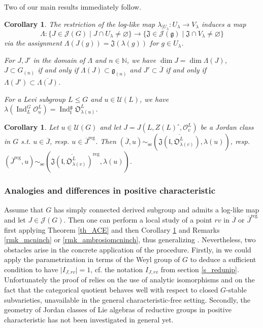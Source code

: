 \documentclass[12pt]{amsart}
\newtheorem{Corollary}[Theorem]{Corollary}
\theoremstyle{definition}
\theoremstyle{remark}
\newcommand{\g}{\mathfrak{g}}
\renewcommand{\l}{\mathfrak{l}}
\newcommand{\J}{\mathfrak{J}}
\newcommand{\orb}{\mathfrak{O}}
\renewcommand{\O}{\mathcal{O}}
\newcommand{\U}{\mathcal{U}}
\newcommand{\reg}{{\operatorname{reg}}}
\newcommand{\Ind}{\operatorname{Ind}}
\newcommand{\se}{\operatorname{se}}
\begin{document}
Two of our main results immediately follow.
\begin{Corollary} \label{cor_respect}
The restriction of the log-like map $\lambda_{\mid U_\lambda} \colon U_\lambda \to V_\lambda$ induces a map
 $$ \Lambda \colon \{  J \in \mathcal{J}(G) \mid J \cap U_\lambda \neq \varnothing \} \to \{ \J \in \mathcal{J}(\g) \mid \J \cap V_\lambda \neq \varnothing \}$$
 via the assignment $\Lambda(J(g)) = \J(\lambda(g))$ for $g \in U_\lambda$.

For $J, J'$ in the domain of $\Lambda$ and $n \in \mathbb{N}$, we have $\dim J = \dim \Lambda(J)$, $J \subset G_{(n)}$ if and only if $\Lambda(J) \subset \g_{(n)}$ and $J' \subset \overline{J}$ if and only if $\Lambda(J') \subset \overline{\Lambda(J)}$.

For a Levi subgroup $L \leq G$ and $u \in  \mathcal{U}(L)$, we have $\lambda(\Ind_L^G \O^L_u) = \Ind_{\l}^{\g} \orb^L_{\lambda(u)}$.
\end{Corollary}

\begin{Corollary} \label{cor_se}
Let  $u \in \U(G)$ and let $J= J(L, Z(L)^\circ, \O^L_v)$ be a Jordan class in $G$ s.t. $u \in \overline{J}$, resp. $u \in \overline{J}^\reg$. Then 
$(\overline{J}, u) \sim_{\se} (\overline{\J(\l, \orb^L_{\lambda(v)})}, \lambda(u))$, resp. $(\overline{J}^\reg, u) \sim_{\se} (\overline{\J(\l, \orb^L_{\lambda(v)})}^\reg, \lambda(u))$.
\end{Corollary}

\subsubsection{Analogies and differences in positive characteristic} \label{sss_summary}
Assume that $G$ has simply connected derived subgroup and admits a log-like map and let $J \in \mathcal{J}(G)$. 
Then one can perform a local study of a point $rv$ in $\overline{J}$ or $\overline{J}^\reg$ first applying Theorem \ref{th_ACE} and then Corollary \ref{cor_se} and Remarks \ref{rmk_mcninch} or \ref{rmk_ambrosiomcninch}, thus generalizing \cite{ACE}.
Nevertheless, 
two obstacles arise in the concrete application of the procedure.
Firstly, in \cite{ACE} we could apply the parametrization in terms of the Weyl group of $G$ to deduce a sufficient condition to have $\lvert I_{J, rv} \rvert = 1$, cf. the notation $I_{J, rv}$  from section \ref{s_redunip}.
Unfortunately the proof of \cite[Lemma 4.8]{ACE} relies on the use of analytic isomorphisms and on the fact that the categorical quotient behaves well with respect to closed $G$-stable subvarieties, unavailable in the general characteristic-free setting.
Secondly, the geometry of Jordan classes of Lie algebras of reductive groups in positive characteristic has not  been investigated in general yet.
\end{document}

